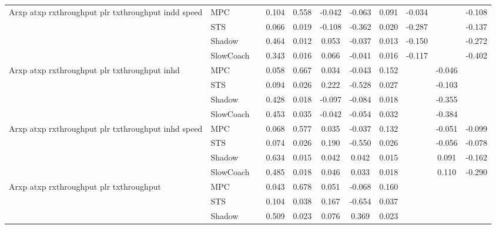 \begin{tabular}{|l|l|*{9}{c|}}
\midrule
Arxp atxp rxthroughput plr txthroughput indd speed    & MPC &       &     0.104 &     0.558 & -0.042 & -0.063 &  0.091 &  -0.034 &      &   -0.108 \\
                              & STS &       &     0.066 &     0.019 & -0.108 & -0.362 &  0.020 &  -0.287 &      &   -0.137 \\
                              & Shadow &       &     0.464 &     0.012 &  0.053 & -0.037 &  0.013 &  -0.150 &      &   -0.272 \\
                              & SlowCoach &       &     0.343 &     0.016 &  0.066 & -0.041 &  0.016 &  -0.117 &      &   -0.402 \\
\midrule
Arxp atxp rxthroughput plr txthroughput inhd    & MPC &       &     0.058 &     0.667 &  0.034 & -0.043 &  0.152 &      &  -0.046 &       \\
                              & STS &       &     0.094 &     0.026 &  0.222 & -0.528 &  0.027 &      &  -0.103 &       \\
                              & Shadow &       &     0.428 &     0.018 & -0.097 & -0.084 &  0.018 &      &  -0.355 &       \\
                              & SlowCoach &       &     0.453 &     0.035 & -0.042 & -0.054 &  0.032 &      &  -0.384 &       \\
\midrule
Arxp atxp rxthroughput plr txthroughput inhd speed    & MPC &       &     0.068 &     0.577 &  0.035 & -0.037 &  0.132 &      &  -0.051 &   -0.099 \\
                              & STS &       &     0.074 &     0.026 &  0.190 & -0.550 &  0.026 &      &  -0.056 &   -0.078 \\
                              & Shadow &       &     0.634 &     0.015 &  0.042 &  0.042 &  0.015 &      &   0.091 &   -0.162 \\
                              & SlowCoach &       &     0.485 &     0.018 &  0.046 &  0.033 &  0.018 &      &   0.110 &   -0.290 \\
\midrule
Arxp atxp rxthroughput plr txthroughput    & MPC &       &     0.043 &     0.678 &  0.051 & -0.068 &  0.160 &      &      &       \\
                              & STS &       &     0.104 &     0.038 &  0.167 & -0.654 &  0.037 &      &      &       \\
                              & Shadow &       &     0.509 &     0.023 &  0.076 &  0.369 &  0.023 &      &      &       \\

\end{tabular}

